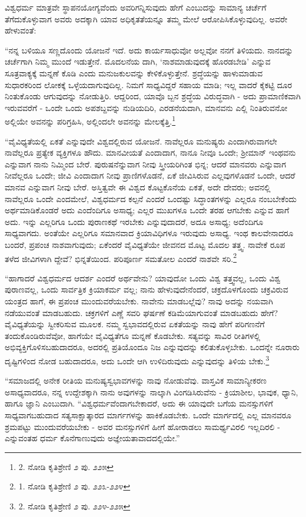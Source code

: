 ವಿಶ್ವಧರ್ಮ ಮಾತ್ರವೇ ಸ್ಥಾಪನಯೋಗ್ಯವೆಂದು ಅವರಿಗನ್ನಿಸುವುದು ಹೇಗೆ ಎಂಬುದನ್ನು ಸಾಮಾನ್ಯ ಚರ್ಚೆಗೆ ತೆಗೆದುಕೊಳ್ಳುವಾಗ ಅವರು ಅದಕ್ಕಾಗಿ ಯಾವ ಅಧಿಕೃತತೆಯನ್ನೂ ತಮ್ಮ ಮೇಲೆ ಆರೋಪಿಸಿಕೊಳ್ಳುವುದಿಲ್ಲ. ಅವರೇ ಹೇಳುವಂತೆ:

“ನನ್ನ ಬಳಿಯೂ ಸಣ್ಣದೊಂದು ಯೋಜನೆ ಇದೆ. ಅದು ಕಾರ್ಯಸಾಧುವೋ ಅಲ್ಲವೋ ನನಗೆ ತಿಳಿಯದು. ನಾನದನ್ನು ಚರ್ಚೆಗಾಗಿ ನಿಮ್ಮ ಮುಂದೆ ಇಡುತ್ತೇನೆ. ಮೊದಲನೆಯ ದಾಗಿ, ‘ನಾಶಮಾಡುವುದಕ್ಕೆ ಹೊರಡಬೇಡಿ’ ಎನ್ನುವ ಸೂತ್ರವಾಕ್ಯಕ್ಕೆ ಮನ್ನಣೆ ಕೊಡಿ ಎಂದು ಮನುಜಕುಲವನ್ನು ಕೇಳಿಕೊಳ್ಳುತ್ತೇನೆ. ಶ್ರದ್ಧೆಯನ್ನು ಹಾಳುಮಾಡುವ ಸುಧಾರಕರಿಂದ ಲೋಕಕ್ಕೆ ಒಳ್ಳೆಯದಾಗುವುದಿಲ್ಲ. ನಿಮಗೆ ಸಾಧ್ಯವಿದ್ದರೆ ಸಹಾಯ ಮಾಡಿ; ಇಲ್ಲ ವಾದರೆ ಕೈಕಟ್ಟಿ ದೂರ ನಿಂತುಕೊಂಡು ಆಗುವುದನ್ನು ನೋಡುತ್ತಿರಿ. ಆದ್ದರಿಂದ, ಯಾವೊ ಬ್ಬನ ಶ್ರದ್ಧೆಯ ವಿರುದ್ಧವಾಗಿ - ಅದು ಪ್ರಾಮಾಣಿಕವಾಗಿ ಇರುವವರೆಗೆ - ಒಂದೇ ಒಂದು ಅಪಶಬ್ದವನ್ನು ನುಡಿಯದಿರಿ, ಎರಡನೆಯದಾಗಿ, ಮಾನವನು ಎಲ್ಲಿ ನಿಂತಿರುವನೋ ಅಲ್ಲಿಯೇ ಅವನನ್ನು ಪರಿಗ್ರಹಿಸಿ, ಅಲ್ಲಿಂದಲೇ ಅವನನ್ನು ಮೇಲಕ್ಕೆತ್ತಿ.\footnote{2. ನೋಡಿ ಕೃತಿಶ್ರೇಣಿ ೨ ಪು. ೨೨೫}

“ವೈವಿಧ್ಯತೆಯಲ್ಲಿ ಏಕತೆ ಎನ್ನುವುದೇ ವಿಶ್ವದಲ್ಲಿರುವ ಯೋಜನೆ. ನಾವೆಲ್ಲರೂ ಮನುಷ್ಯರು ಎಂದಾಗಿರುವಾಗಲೇ ನಾವೆಲ್ಲರೂ ಪ್ರತ್ಯೇಕ ವ್ಯಕ್ತಿಗಳೂ ಹೌದು. ಮಾನವೀಯತೆ ಎಂದಾದಾಗ, ನಾನೂ ನೀವೂ ಒಂದೇ; ಶ‍್ರೀಮಾನ್ ಇಂಥವನು ಎನ್ನುವಾಗ ನಾನು ನಿಮ್ಮಿಂದ ಬೇರೆ. ಪುರುಷನೆನ್ನುವಾಗ ನೀವು ಸ್ತ್ರೀಯರಿಗಿಂತ ಭಿನ್ನ; ಆದರೆ ಮಾನವರು ಎನ್ನುವಾಗ ನೀವೆಲ್ಲರೂ ಒಂದೇ; ಜೀವಿ ಎಂದಾದಾಗ ನೀವು ಪ್ರಾಣಿಗಳೊಡನೆ, ಏಕೆ ಜೀವಿಸಿರುವ ಎಲ್ಲವುಗಳೊಡನೆ ಒಂದೇ, ಆದರೆ ಮಾನವ ಎನ್ನುವಾಗ ನೀವು ಬೇರೆ. ಅಸ್ತಿತ್ವವೇ ಈ ವಿಶ್ವದ ಕೊಟ್ಟಕೊನೆಯ ಏಕತೆ, ಅದೇ ದೇವರು; ಅವನಲ್ಲಿ ನಾವೆಲ್ಲರೂ ಒಂದೇ ಎಂದಮೇಲೆ, ವಿಶ್ವಧರ್ಮದ ಕಲ್ಪನೆ ಎಂದರೆ ಒಂದಷ್ಟು ಸಿದ್ಧಾಂತಗಳನ್ನು ಎಲ್ಲರೂ ನಂಬಬೇಕೆಂದು ಅರ್ಥಮಾಡಿಕೊಂಡರೆ ಅದು ಎಂದೆಂದಿಗೂ ಅಸಾಧ್ಯ; ಎಲ್ಲರ ಮುಖಗಳೂ ಒಂದೇ ತರಹ ಆಗಬೇಕು ಎನ್ನುವ ಹಾಗೆ ಅದು. ಇನ್ನು ಎಲ್ಲರಿಗೂ ಒಂದು ಪುರಾಣಕಥೆ ಇರಬೇಕು ಎನ್ನುವುದಾದರೆ, ಅದೂ ಅಸಾಧ್ಯ; ಅದೆಂದಿಗೂ ಸಾಧ್ಯವಾಗದು. ಅಂತೆಯೇ ಎಲ್ಲರಿಗೂ ಸಮಾನವಾದ ಕ್ರಿಯಾವಿಧಿಗಳೂ ಇರುವುದು ಅಸಾಧ್ಯ. ಇಂಥ ಕಾಲವೇನಾದರೂ ಬಂದರೆ, ಪ್ರಪಂಚ ನಾಶವಾಗುವುದು; ಏಕೆಂದರೆ ವೈವಿಧ್ಯತೆಯೇ ಜೀವನದ ಮೊಟ್ಟ ಮೊದಲ ತತ್ತ್ವ. ನಾವೇಕೆ ರೂಪ ತಳೆದ ಜೀವಿಗಳಾಗಿ ದ್ದೇವೆ? ಭಿನ್ನತೆಯಿಂದ. ಪರಿಪೂರ್ಣ ಸಮತೋಲ ಎಂದರೆ ನಾಶವೇ ಸರಿ.\footnote{1. ನೋಡಿ ಕೃತಿಶ್ರೇಣಿ ೨ ಪು. ೨೨೩-೨೨೪}

“ಹಾಗಾದರೆ ವಿಶ್ವಧರ್ಮದ ಆದರ್ಶ ಎಂದರೆ ಅರ್ಥವೇನು? ಯಾವುದೋ ಒಂದು ವಿಶ್ವ ತತ್ತ್ವವಲ್ಲ, ಒಂದು ವಿಶ್ವ ಪುರಾಣವಲ್ಲ, ಒಂದು ಸಾರ್ವತ್ರಿಕ ಕ್ರಿಯಾಕರ್ಮ ವಲ್ಲ; ನಾನು ಹೇಳುವುದೇನೆಂದರೆ, ಚಕ್ರದೊಳಗೊಂದು ಚಕ್ರವಿರುವ ಯಂತ್ರದ ಹಾಗೆ, ಈ ಪ್ರಪಂಚ ಮುಂದುವರೆಯಬೇಕು. ನಾವೇನು ಮಾಡಬಲ್ಲೆವು? ನಾವು ಅದನ್ನು ನಯವಾಗಿ ನಡೆಯುವಂತೆ ಮಾಡಬಹುದು. ಚಕ್ರಗಳಿಗೆ ಎಣ್ಣೆ ಸವರಿ ಘರ್ಷಣೆ ಕಡಿಮೆಯಾಗುವಂತೆ ಮಾಡಬಹುದು ಹೇಗೆ? ವೈವಿಧ್ಯತೆಯನ್ನು ಸ್ವೀಕರಿಸುವ ಮೂಲಕ. ನಮ್ಮ ಸ್ವಭಾವದಲ್ಲಿರುವ ಏಕತೆಯನ್ನು ನಾವು ಹೇಗೆ ಪರಿಗಣನೆಗೆ ತಂದುಕೊಂಡಿರುವೆವೋ, ಹಾಗೆಯೇ ವೈವಿಧ್ಯತೆಗೂ ಮನ್ನಣೆ ಕೊಡಬೇಕು. ಸತ್ಯವನ್ನು ಸಾವಿರ ರೀತಿಗಳಲ್ಲಿ ಅಭಿವ್ಯಕ್ತಿಗೊಳಿಸಬಹುದಾದರೂ, ಅದರಲ್ಲಿ ಪ್ರತಿಯೊಂದೂ ನಿಜ ಎನ್ನುವುದನ್ನು ಕಲಿತುಕೊಳ್ಳಬೇಕು. ಒಂದನ್ನೇ ನೂರಾರು ದೃಷ್ಟಿಗಳಿಂದ ನೋಡ ಬಹುದಾದರೂ, ಅದು ಒಂದೇ ಆಗಿ ಉಳಿದಿರುವುದು ಎನ್ನುವುದನ್ನು ತಿಳಿಯ ಬೇಕು.\footnote{2. ನೋಡಿ ಕೃತಿಶ್ರೇಣಿ ೨ ಪು. ೨೨೪-೨೨೫}

“ಸಮಾಜದಲ್ಲಿ ಅನೇಕ ರೀತಿಯ ಮನುಷ್ಯಸ್ವಭಾವಗಳನ್ನು ನಾವು ನೋಡುವೆವು. ವಾಸ್ತವಿಕ ಸಾಮಾನ್ಯೀಕರಣ ಅಸಾಧ್ಯವಾದರೂ, ನನ್ನ ಉದ್ದೇಶಕ್ಕಾಗಿ ನಾನು ಅವುಗಳನ್ನು ನಾಲ್ಕಾಗಿ ವಿಂಗಡಿಸಿರುವೆನು - ಕ್ರಿಯಾಶೀಲ, ಭಾವುಕ, ಧ್ಯಾನಿ, ಹಾಗೂ ಜ್ಞಾನಿ ಎಂಬುದಾಗಿ. “ವಿಶ್ವಧರ್ಮವೆಂದಾಗಬೇಕಾದರೆ, ಅದು ಈ ಯಾವುದೇ ಬಗೆಯ ಮನಸ್ಸುಗಳಿಗೆ ಸಾಧ್ಯವಾಗಬಹುದಾದ ಸತ್ಯಸಾಕ್ಷಾತ್ಕಾರದ ಮಾರ್ಗಗಳನ್ನು ಹಾಕಿಕೊಡಬೇಕು. ಒಂದೇ ಮಾರ್ಗದಲ್ಲಿ ಎಲ್ಲ ಮಾನವರೂ ಶ್ರಮಪಟ್ಟು ಮುಂದುವರೆಯಬೇಕು - ಅವರ ಮನಸ್ಸುಗಳಿಗೆ ಹೀಗೆ ಹೋರಾಡಲು ಸಾಮರ್ಥ್ಯವಿರಲಿ ಇಲ್ಲದಿರಲಿ - ಎನ್ನುವಂತಹ ಧರ್ಮ ಕೊನೆಗಾಣುವುದು ಅಜ್ಞೇಯತಾವಾದದಲ್ಲಿಯೇ.”

